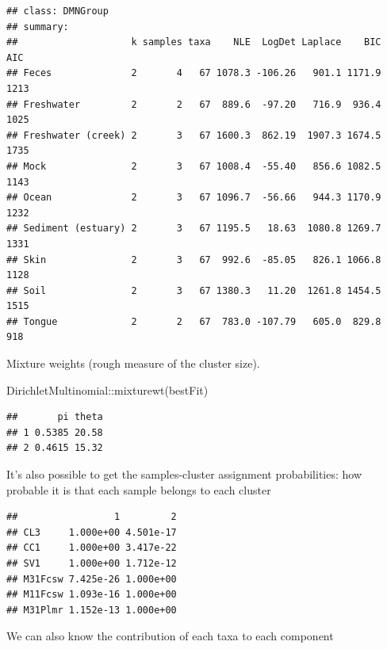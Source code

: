 \documentclass[
]{book}
\newenvironment{Shaded}{\begin{snugshade}}{\end{snugshade}}
\newcommand{\FunctionTok}[1]{\textcolor[rgb]{0.00,0.00,0.00}{#1}}
\newcommand{\NormalTok}[1]{#1}
\newcommand{\OtherTok}[1]{\textcolor[rgb]{0.56,0.35,0.01}{#1}}
\newcommand{\SpecialCharTok}[1]{\textcolor[rgb]{0.00,0.00,0.00}{#1}}
\begin{document}
\begin{verbatim}
## class: DMNGroup 
## summary:
##                    k samples taxa    NLE  LogDet Laplace    BIC  AIC
## Feces              2       4   67 1078.3 -106.26   901.1 1171.9 1213
## Freshwater         2       2   67  889.6  -97.20   716.9  936.4 1025
## Freshwater (creek) 2       3   67 1600.3  862.19  1907.3 1674.5 1735
## Mock               2       3   67 1008.4  -55.40   856.6 1082.5 1143
## Ocean              2       3   67 1096.7  -56.66   944.3 1170.9 1232
## Sediment (estuary) 2       3   67 1195.5   18.63  1080.8 1269.7 1331
## Skin               2       3   67  992.6  -85.05   826.1 1066.8 1128
## Soil               2       3   67 1380.3   11.20  1261.8 1454.5 1515
## Tongue             2       2   67  783.0 -107.79   605.0  829.8  918
\end{verbatim}

Mixture weights (rough measure of the cluster size).

\begin{Shaded}
\begin{Highlighting}[]
\NormalTok{DirichletMultinomial}\SpecialCharTok{::}\FunctionTok{mixturewt}\NormalTok{(bestFit)}
\end{Highlighting}
\end{Shaded}

\begin{verbatim}
##       pi theta
## 1 0.5385 20.58
## 2 0.4615 15.32
\end{verbatim}

It's also possible to get the samples-cluster assignment probabilities: how
probable it is that each sample belongs to each cluster

\begin{Shaded}
\end{Shaded}

\begin{verbatim}
##                 1         2
## CL3     1.000e+00 4.501e-17
## CC1     1.000e+00 3.417e-22
## SV1     1.000e+00 1.712e-12
## M31Fcsw 7.425e-26 1.000e+00
## M11Fcsw 1.093e-16 1.000e+00
## M31Plmr 1.152e-13 1.000e+00
\end{verbatim}

We can also know the contribution of each taxa to each component
\end{document}
